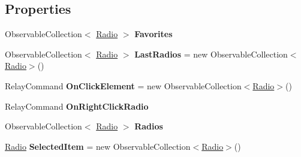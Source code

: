 \subsection*{Properties}
\begin{DoxyCompactItemize}
\item 
\mbox{\label{class_presentation_1_1_view_model_1_1_radio_view_model_a2ad0f43696a0ee6938f82c3fb82638f4}} 
Observable\+Collection$<$ \hyperlink{class_d_t_o_1_1_entity_1_1_radio}{Radio} $>$ {\bfseries Favorites}
\item 
\mbox{\label{class_presentation_1_1_view_model_1_1_radio_view_model_a90346596db447a2c8dfdb631623456bf}} 
Observable\+Collection$<$ \hyperlink{class_d_t_o_1_1_entity_1_1_radio}{Radio} $>$ {\bfseries Last\+Radios} = new Observable\+Collection$<$\hyperlink{class_d_t_o_1_1_entity_1_1_radio}{Radio}$>$()
\item 
\mbox{\label{class_presentation_1_1_view_model_1_1_radio_view_model_a9e2abbd9a4f24623faf92c012446b5ea}} 
Relay\+Command {\bfseries On\+Click\+Element} = new Observable\+Collection$<$\hyperlink{class_d_t_o_1_1_entity_1_1_radio}{Radio}$>$()
\item 
\mbox{\label{class_presentation_1_1_view_model_1_1_radio_view_model_a3ae8d972e88c7675dfe83fee21f4192f}} 
Relay\+Command {\bfseries On\+Right\+Click\+Radio}
\item 
\mbox{\label{class_presentation_1_1_view_model_1_1_radio_view_model_af036b68b8628aa922fef14c18be9ede5}} 
Observable\+Collection$<$ \hyperlink{class_d_t_o_1_1_entity_1_1_radio}{Radio} $>$ {\bfseries Radios}
\item 
\mbox{\label{class_presentation_1_1_view_model_1_1_radio_view_model_ad9487bf37aee2b51ce7cbce807f54071}} 
\hyperlink{class_d_t_o_1_1_entity_1_1_radio}{Radio} {\bfseries Selected\+Item} = new Observable\+Collection$<$\hyperlink{class_d_t_o_1_1_entity_1_1_radio}{Radio}$>$()
\end{DoxyCompactItemize}


